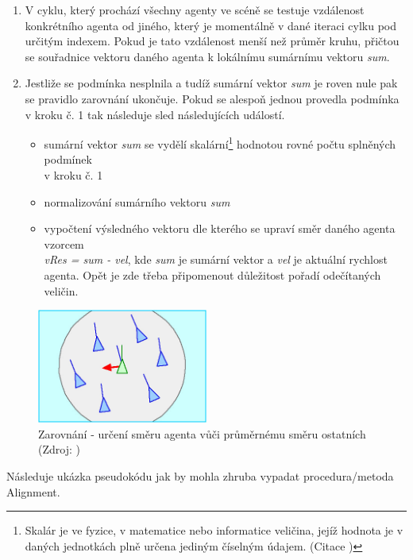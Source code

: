 \documentclass[czech,public,dept460,male,cpdeclaration]{diploma}
\begin{document}
\begin{enumerate}
	\item V cyklu, který prochází všechny agenty ve scéně se testuje vzdálenost konkrétního agenta od jiného, který je momentálně v dané iteraci cylku pod určitým indexem. Pokud je tato vzdálenost menší než průměr kruhu, přičtou se souřadnice vektoru daného agenta k lokálnímu sumárnímu vektoru \textit{sum}.
	\item Jestliže se podmínka nesplnila a tudíž sumární vektor \textit{sum} je roven nule pak se pravidlo zarovnání ukončuje. Pokud se alespoň jednou provedla podmínka v kroku č. 1 tak následuje sled následujících událostí.
	
	\begin{itemize}
		\item sumární vektor \textit{sum} se vydělí skalární\footnote{Skalár je ve fyzice, v matematice nebo informatice veličina, jejíž hodnota je v daných jednotkách plně určena jediným číselným údajem. (Citace \cite{linkToScalar})} hodnotou rovné počtu splněných podmínek \\v kroku č. 1
		\item normalizování sumárního vektoru \textit{sum}
		\item vypočtení výsledného vektoru dle kterého se upraví směr daného agenta vzorcem \\\textit{vRes = sum - vel}, kde \textit{sum} je sumární vektor a \textit{vel} je aktuální rychlost agenta. Opět je zde třeba připomenout důležitost pořadí odečítaných veličin.
	\end{itemize}
	
\end{enumerate}

\begin{figure}[H]\centering\includegraphics[width=0.5\textwidth]{Figures/alignment.jpg}
	\caption{Zarovnání - určení směru agenta vůči průměrnému směru ostatních (Zdroj: \cite{link2})}
\end{figure}

Následuje ukázka pseudokódu jak by mohla zhruba vypadat procedura/metoda Alignment.
\end{document}
